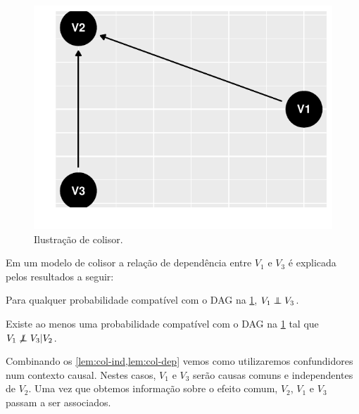 \begin{knitrout}
\color{fgcolor}\begin{figure}[t]

{\centering \includegraphics[width=\maxwidth]{./figures/colisor-1} 

}

\caption[Ilustração de colisor]{Ilustração de colisor.}\label{fig:colisor}
\end{figure}

\end{knitrout}

Em um modelo de colisor 
a relação de dependência entre 
$V_1$ e $V_3$ é explicada pelos
resultados a seguir:

\begin{lemma}
 \label{lem:col-ind}
 Para qualquer probabilidade compatível com 
 o DAG na \cref{fig:colisor},
 $V_1 \perp\!\!\!\!\perp V_3$.
\end{lemma}

\begin{lemma}
 \label{lem:col-dep}
 Existe ao menos uma probabilidade compatível com
 o DAG na \cref{fig:colisor} tal que
 $V_1 \not\perp\!\!\!\!\perp V_3 | V_2$.
\end{lemma}

Combinando os \cref{lem:col-ind,lem:col-dep} vemos 
como utilizaremos confundidores num contexto causal.
Nestes casos, $V_1$ e $V_3$ serão causas comuns e independentes de $V_2$.
Uma vez que obtemos informação sobre o efeito comum, $V_2$,
$V_1$ e $V_3$ passam a ser associados.

